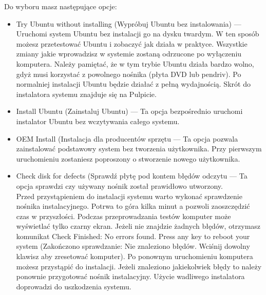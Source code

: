 \noindent Do wyboru masz następujące opcje:
\begin{itemize}
\item \textcolor{ubuntu_orange}{Try Ubuntu without installing (Wypróbuj Ubuntu bez instalowania)} --- Uruchomi system Ubuntu bez instalacji go na dysku twardym. W ten sposób możesz przetestować Ubuntu i zobaczyć jak działa w praktyce. Wszystkie zmiany jakie wprowadzisz w systemie zostaną odrzucone po wyłączeniu komputera. Należy pamiętać, że w tym trybie Ubuntu działa bardzo wolno, gdyż musi korzystać z powolnego nośnika (płyta DVD lub pendriv). Po normalniej instalacji Ubuntu będzie działać z pełną wydajnością. Skrót do instalatora systemu znajduje się na Pulpicie.
\item \textcolor{ubuntu_orange}{Install Ubuntu (Zainstaluj Ubuntu)} --- Ta opcja bezpośrednio uruchomi instalator Ubuntu bez wczytywania całego systemu.
\item \textcolor{ubuntu_orange}{OEM Install (Instalacja dla producentów sprzętu} --- Ta opcja pozwala zainstalować podstawowy system bez tworzenia użytkownika. Przy pierwszym uruchomieniu zostaniesz poproszony o stworzenie nowego użytkownika.
\item \textcolor{ubuntu_orange}{Check disk for defects (Sprawdź płytę pod kontem błędów odczytu} --- Ta opcja sprawdzi czy używany nośnik został prawidłowo utworzony.\\
Przed przystąpieniem do instalacji systemu warto wykonać sprawdzenie nośnika instalacyjnego. Potrwa to góra kilka minut a pozwoli zaoszczędzić czas w przyszłości. Podczas przeprowadzania testów komputer może wyświetlać tylko czarny ekran. Jeżeli nie znajdzie żadnych błędów, otrzymasz komunikat \textcolor{ubuntu_orange}{Check Finished: No errors found. Press any key to reboot your system (Zakończono sprawdzanie: Nie znaleziono błędów. Wciśnij dowolny klawisz aby zresetować komputer)}. Po ponownym uruchomieniu komputera możesz przystąpić do instalacji. Jeżeli znaleziono jakiekolwiek błędy to należy ponownie przygotować nośnik instalacyjny. Użycie wadliwego instalatora doprowadzi do uszkodzenia systemu. 
\end{itemize}
\clearpage
